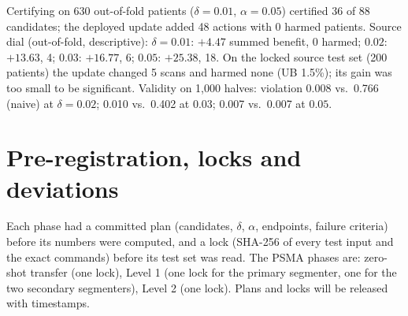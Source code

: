  Certifying on 630 out-of-fold patients ($\delta=0.01$, $\alpha=0.05$) certified 36 of 88 candidates; the deployed update added 48 actions with 0 harmed patients. Source dial (out-of-fold, descriptive): $\delta=0.01$: $+4.47$ summed benefit, 0 harmed; $0.02$: $+13.63$, 4; $0.03$: $+16.77$, 6; $0.05$: $+25.38$, 18. On the locked source test set (200 patients) the update changed 5 scans and harmed none (UB 1.5\%); its gain was too small to be significant. Validity on 1,000 halves: violation 0.008 vs.\ 0.766 (naive) at $\delta=0.02$; 0.010 vs.\ 0.402 at $0.03$; 0.007 vs.\ 0.007 at $0.05$.

\section{Pre-registration, locks and deviations}
\label{sec:supp_deviations}

 Each phase had a committed plan (candidates, $\delta$, $\alpha$, endpoints, failure criteria) before its numbers were computed, and a lock (SHA-256 of every test input and the exact commands) before its test set was read. The PSMA phases are: zero-shot transfer (one lock), Level 1 (one lock for the primary segmenter, one for the two secondary segmenters), Level 2 (one lock). Plans and locks will be released with timestamps.

